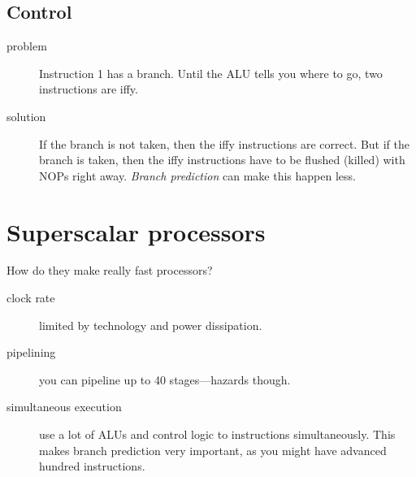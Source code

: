 \subsection{Control}
\begin{description}
	\item[problem] Instruction 1 has a branch. Until the ALU tells you where to go, two instructions are iffy.
	\item[solution] If the branch is not taken, then the iffy instructions are correct. But if the branch is taken, then the iffy instructions have to be flushed (killed) with NOPs right away. \emph{Branch prediction} can make this happen less.
\end{description}

\section{Superscalar processors}
How do they make really fast processors?
\begin{description}
	\item[clock rate] limited by technology and power dissipation.
	\item[pipelining] you can pipeline up to 40 stages---hazards though.
	\item[simultaneous execution] use a lot of ALUs and control logic to instructions simultaneously. This makes branch prediction very important, as you might have advanced hundred instructions.
\end{description}